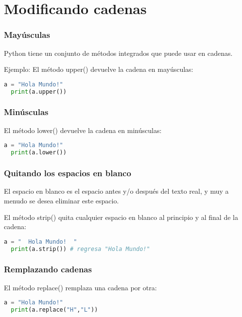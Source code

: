 \section{Modificando cadenas}

\begin{frame}[fragile]
  \frametitle{Mayúsculas}

  Python tiene un conjunto de métodos integrados que puede usar en cadenas.

  \vspace{\baselineskip}
  Ejemplo: El método \textcolor{codeKeyword}{upper}() devuelve la
  cadena en mayúsculas: 
  \begin{lstlisting}[language=Python]
  a = "Hola Mundo!"
  print(a.upper())
  \end{lstlisting}
\end{frame}

\begin{frame}[fragile]
  \frametitle{Minúsculas}

  El método \textcolor{codeKeyword}{lower}() devuelve la
  cadena en minúsculas: 

  \begin{lstlisting}[language=Python]
  a = "Hola Mundo!"
  print(a.lower())
  \end{lstlisting}
\end{frame}

\begin{frame}[fragile]
  \frametitle{Quitando los espacios en blanco}

  El espacio en blanco es el espacio antes y/o después del texto real,
  y muy a menudo se desea eliminar este espacio.

  \vspace{\baselineskip}
  El método \textcolor{codeKeyword}{strip}() quita cualquier espacio en
  blanco al principio y al final de la cadena:

  \begin{lstlisting}[language=Python]
  a = "  Hola Mundo!  "
  print(a.strip()) # regresa "Hola Mundo!"
  \end{lstlisting}
\end{frame}

\begin{frame}[fragile]
  \frametitle{Remplazando cadenas}

  El método \textcolor{codeKeyword}{replace}() remplaza una cadena por otra:

  \vspace{\baselineskip}
  \begin{lstlisting}[language=Python]
  a = "Hola Mundo!"
  print(a.replace("H","L"))
  \end{lstlisting}
\end{frame}

